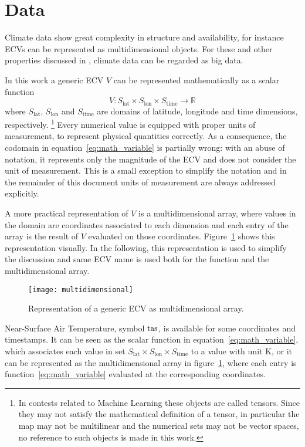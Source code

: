 \section{Data}
\label{sec:Data}
Climate data show great complexity in structure and availability, for instance \glspl{ECV} can be represented as multidimensional objects. For these and other properties discussed in \cite{2014FaghmousABig}, climate data can be regarded as big data.

In this work a generic \gls{ECV} $V$ can be represented mathematically as a scalar function
\begin{equation}
  \label{eq:math_variable}
  V : S_\text{lat} \times S_\text{lon} \times S_\text{time} \to \mathbb{R}
\end{equation}
where $S_\text{lat}$, $S_\text{lon}$ and $S_\text{time}$ are domains of latitude, longitude and time dimensions, respectively.%
\footnote{In contests related to Machine Learning these objects are called tensors. Since they may not satisfy the mathematical definition of a tensor, in particular the map may not be multilinear and the numerical sets may not be vector spaces, no reference to such objects is made in this work.}
Every numerical value is equipped with proper units of measurement, to represent physical quantities correctly. As a consequence, the codomain in equation~\eqref{eq:math_variable} is partially wrong: with an abuse of notation, it represents only the magnitude of the \gls{ECV} and does not consider the unit of measurement. This is a small exception to simplify the notation and in the remainder of this document units of measurement are always addressed explicitly.

A more practical representation of $V$ is a multidimensional array, where values in the domain are coordinates associated to each dimension and each entry of the array is the result of $V$ evaluated on those coordinates. Figure~\ref{fig:multidimensional} shows this representation visually. In the following, this representation is used to simplify the discussion and same \gls{ECV} name is used both for the function and the multidimensional array.
\begin{figure}[h]
  \centering
  \texttt{[image: multidimensional]}
  \caption{Representation of a generic \gls{ECV} as multidimensional array.}
  \label{fig:multidimensional}
\end{figure}

\begin{example}
  Near-Surface Air Temperature, symbol $\mathrm{tas}$, is available for some coordinates and timestamps. It can be seen as the scalar function in equation~\eqref{eq:math_variable}, which associates each value in set $S_\text{lat} \times S_\text{lon} \times S_\text{time}$ to a value with unit \unit{\kelvin}, or it can be represented as the multidimensional array in figure~\ref{fig:multidimensional}, where each entry is function~\eqref{eq:math_variable} evaluated at the corresponding coordinates.
\end{example}

